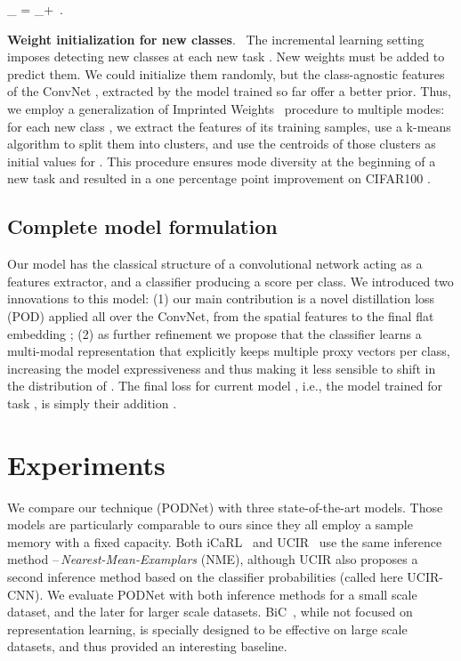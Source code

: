 \documentclass[runningheads]{llncs}
\newcommand{\mcL}{\mathcal{L}}
\newcommand{\vy}{\mathbf{y}}
\newcommand{\vyh}{\hat\vy}
\newcommand{\parag}[1]{\vspace{0.2cm}\noindent\textbf{#1}.\ }
\begin{document}
    \mcL_ = \left[- \log\frac{\exp\left(\eta (\vyh_y - \delta)\right)}{\sum_{i \neq y} \exp \eta \vyh_{i}} \right]_+ \,.


\parag{Weight initialization for new classes} The incremental learning setting imposes detecting new classes at each new task . New weights  must be added to predict them. We could initialize them randomly, but the class-agnostic features of the ConvNet , extracted by the model trained so far offer a better prior. Thus, we employ a generalization of Imprinted Weights~\cite{qi2018imprintedweights} procedure to multiple modes: for each new class , we extract the features of its training samples, use a k-means algorithm to split them into  clusters, and use the centroids of those clusters as initial values for . This procedure ensures mode diversity at the beginning of a new task and resulted in a one percentage point improvement on CIFAR100 \cite{krizhevskycifar100}.



\subsection{Complete model formulation}

Our model has the classical structure of a convolutional network  acting as a features extractor, and a classifier  producing a score per class. We introduced two innovations to this model: (1) our main contribution is a novel distillation loss (POD) applied all over the ConvNet, from the spatial features  to the final flat embedding ; (2) as further refinement we propose that the classifier learns a multi-modal representation that explicitly keeps multiple proxy vectors per class, increasing the model expressiveness and thus making it less sensible to shift in the distribution of . The final loss for current model , i.e., the model trained for task , is simply their addition .


\section{Experiments}
\label{sec:expes}






We compare our technique (PODNet) with three state-of-the-art models. Those models are particularly comparable to ours since they all employ a sample memory with a fixed capacity. Both iCaRL~\cite{rebuffi2017icarl} and UCIR~\cite{hou2019ucir} use the same inference method --\,\textit{Nearest-Mean-Examplars} (NME), although UCIR also proposes a second inference method based on the classifier probabilities (called here UCIR-CNN). We evaluate PODNet with both inference methods for a small scale dataset, and the later for larger scale datasets. BiC~\cite{wu2019bias_correction}, while not focused on representation learning, is specially designed to be effective on large scale datasets, and thus provided an interesting baseline.
\end{document}
